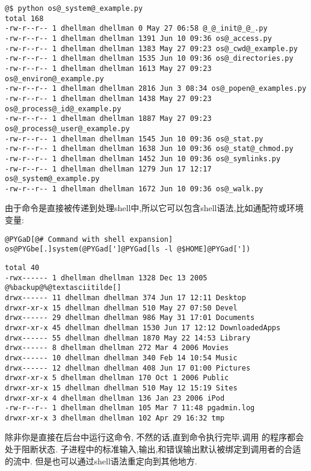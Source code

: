 \documentclass[a4paper,10pt,english]{manual}
\begin{document}
\begin{Verbatim}[commandchars=@\[\]]
@$ python os@_system@_example.py
total 168
-rw-r--r-- 1 dhellman dhellman 0 May 27 06:58 @_@_init@_@_.py
-rw-r--r-- 1 dhellman dhellman 1391 Jun 10 09:36 os@_access.py
-rw-r--r-- 1 dhellman dhellman 1383 May 27 09:23 os@_cwd@_example.py
-rw-r--r-- 1 dhellman dhellman 1535 Jun 10 09:36 os@_directories.py
-rw-r--r-- 1 dhellman dhellman 1613 May 27 09:23 os@_environ@_example.py
-rw-r--r-- 1 dhellman dhellman 2816 Jun 3 08:34 os@_popen@_examples.py
-rw-r--r-- 1 dhellman dhellman 1438 May 27 09:23 os@_process@_id@_example.py
-rw-r--r-- 1 dhellman dhellman 1887 May 27 09:23 os@_process@_user@_example.py
-rw-r--r-- 1 dhellman dhellman 1545 Jun 10 09:36 os@_stat.py
-rw-r--r-- 1 dhellman dhellman 1638 Jun 10 09:36 os@_stat@_chmod.py
-rw-r--r-- 1 dhellman dhellman 1452 Jun 10 09:36 os@_symlinks.py
-rw-r--r-- 1 dhellman dhellman 1279 Jun 17 12:17 os@_system@_example.py
-rw-r--r-- 1 dhellman dhellman 1672 Jun 10 09:36 os@_walk.py
\end{Verbatim}

由于命令是直接被传递到处理shell中,所以它可以包含shell语法,比如通配符或环境变量:

\begin{Verbatim}[commandchars=@\[\]]
@PYGaD[@# Command with shell expansion]
os@PYGbe[.]system(@PYGad[']@PYGad[ls -l @$HOME]@PYGad['])
\end{Verbatim}

\begin{Verbatim}[commandchars=@\[\]]
total 40
-rwx------ 1 dhellman dhellman 1328 Dec 13 2005 @%backup@%@textasciitilde[]
drwx------ 11 dhellman dhellman 374 Jun 17 12:11 Desktop
drwxr-xr-x 15 dhellman dhellman 510 May 27 07:50 Devel
drwx------ 29 dhellman dhellman 986 May 31 17:01 Documents
drwxr-xr-x 45 dhellman dhellman 1530 Jun 17 12:12 DownloadedApps
drwx------ 55 dhellman dhellman 1870 May 22 14:53 Library
drwx------ 8 dhellman dhellman 272 Mar 4 2006 Movies
drwx------ 10 dhellman dhellman 340 Feb 14 10:54 Music
drwx------ 12 dhellman dhellman 408 Jun 17 01:00 Pictures
drwxr-xr-x 5 dhellman dhellman 170 Oct 1 2006 Public
drwxr-xr-x 15 dhellman dhellman 510 May 12 15:19 Sites
drwxr-xr-x 4 dhellman dhellman 136 Jan 23 2006 iPod
-rw-r--r-- 1 dhellman dhellman 105 Mar 7 11:48 pgadmin.log
drwxr-xr-x 3 dhellman dhellman 102 Apr 29 16:32 tmp
\end{Verbatim}

除非你是直接在后台中运行这命令, 不然的话,直到命令执行完毕,调用  的程序都会处于阻断状态. 子进程中的标准输入,输出,和错误输出默认被绑定到调用者的合适的流中. 但是也可以通过shell语法重定向到其他地方.
\end{document}
